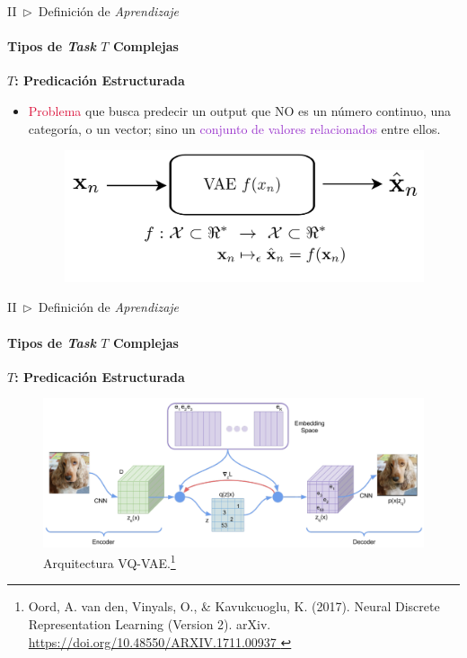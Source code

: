 \documentclass[xcolor=dvipsnames]{beamer}
\begin{document}
    \begin{frame}{II~$\rhd$~Definición de \textit{Aprendizaje}}
    \framesubtitle{Tipos de \textit{Task} \( T \) Complejas}
        \textbf{\Large{\( T \): Predicación Estructurada}}
        \vspace{2mm}
        \begin{itemize}
            \item \textcolor{crimson}{Problema} que busca predecir un output que NO es un número continuo, una categoría, o un vector; sino un \textcolor{DarkOrchid}{conjunto de valores relacionados} entre ellos.
            \vspace{1mm}
            \begin{figure}
                \centering
                \includegraphics[width=0.8\linewidth]{imgs/def01/task08.png}
            \end{figure}
        \end{itemize}
    \end{frame}

    \begin{frame}{II~$\rhd$~Definición de \textit{Aprendizaje}}
    \framesubtitle{Tipos de \textit{Task} \( T \) Complejas}
        \textbf{\Large{\( T \): Predicación Estructurada}}
        \vspace{2mm}
        \begin{figure}
            \centering
            \includegraphics[width=0.9\linewidth]{imgs/def01/oord2018neuraldiscreterepresentationlearning-img01.png}
            \caption{Arquitectura VQ-VAE.\footnote{\tiny{Oord, A. van den, Vinyals, O., \& Kavukcuoglu, K. (2017). Neural Discrete Representation Learning (Version 2). arXiv. \url{https://doi.org/10.48550/ARXIV.1711.00937 }}}}
        \end{figure}
    \end{frame}
\end{document}
